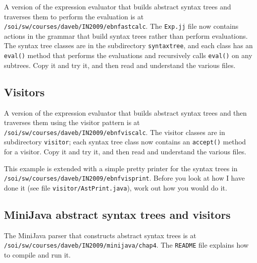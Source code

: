 \documentclass{article}
\begin{document}
A version of the expression evaluator that builds abstract
syntax trees and traverses them to perform the
evaluation is at \verb+/soi/sw/courses/daveb/IN2009/ebnfastcalc+.
The \verb+Exp.jj+ file now contains actions in
the grammar that build syntax trees rather 
than perform evaluations.
The syntax tree classes are in the subdirectory \verb+syntaxtree+,
and each class has an \verb+eval()+ method that performs the
evaluations and recursively calls \verb+eval()+ on
any subtrees.  
Copy it and try it, and then read and understand the various
files.

\subsection*{Visitors}

A version of the expression evaluator that builds
abstract syntax trees and then traverses them using
the visitor pattern is at
\verb+/soi/sw/courses/daveb/IN2009/ebnfviscalc+.
The visitor classes are in subdirectory \verb+visitor+;
each syntax tree class now contains an \verb+accept()+
method for a visitor.
Copy it and try it, and then read and understand the various
files. 

This example is extended with a simple pretty printer for
the syntax trees in \\
\verb+/soi/sw/courses/daveb/IN2009/ebnfvisprint+.
Before you look at how I have done it (see file \verb+visitor/AstPrint.java+),
work out how you would do it.

\subsection*{MiniJava abstract syntax trees and visitors}

The MiniJava parser that constructs abstract syntax trees is at
\\
 \verb+/soi/sw/courses/daveb/IN2009/minijava/chap4+.
The \verb+README+ file explains how to compile and
run it.
\end{document}
